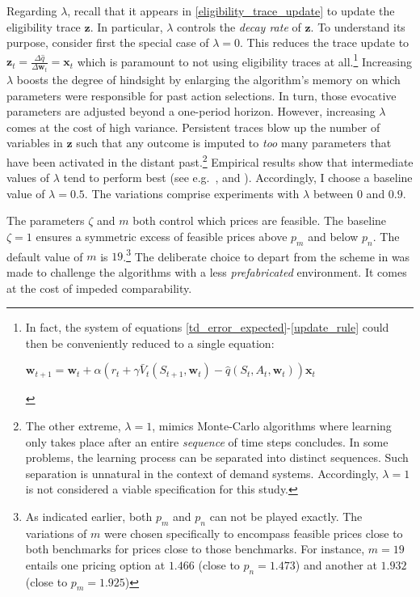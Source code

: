 {Regarding $\lambda$, recall that it appears in \autoref{eligibility_trace_update} to update the eligibility trace $\boldsymbol{z}$. In particular, $\lambda$ controls the \emph{decay rate} of $\boldsymbol{z}$. To understand its purpose, consider first the special case of $\lambda = 0$. This reduces the trace update to $\boldsymbol{z}_t = \frac{\Delta \hat{q}}{\Delta \boldsymbol{w}_t} = \boldsymbol{x}_t$ which is paramount to not using eligibility traces at all.\footnote{In fact, the system of equations \ref{td_error_expected}-\ref{update_rule} could then be conveniently reduced to a single equation:
	\begin{center}
		$\boldsymbol{w}_{t+1} = \boldsymbol{w}_t + \alpha (r_t + \gamma \bar{V}_t(S_{t+1}, \boldsymbol{w}_t) - \hat{q}(S_t, A_t, \boldsymbol{w}_t)) \boldsymbol{x}_t$
	\end{center}
} Increasing $\lambda$ boosts the degree of hindsight by enlarging the algorithm's memory on which parameters were responsible for past action selections. In turn, those evocative parameters are adjusted beyond a one-period horizon. However, increasing $\lambda$ comes at the cost of high variance. Persistent traces blow up the number of variables in $\boldsymbol{z}$ such that any outcome is imputed to \emph{too} many parameters that have been activated in the distant past.\footnote{The other extreme, $\lambda = 1$, mimics Monte-Carlo algorithms where learning only takes place after an entire \emph{sequence} of time steps concludes. In some problems, the learning process can be separated into distinct sequences. Such separation is unnatural in the context of demand systems. Accordingly, $\lambda = 1$ is not considered a viable specification for this study.} Empirical results show that intermediate values of $\lambda$ tend to perform best (see e.g.\ \textcite{sutton_learning_1988}, \textcite{rummery_-line_1994} and \textcite{sutton_reinforcement_2018}). Accordingly, I choose a baseline value of $\lambda = 0.5$. The variations comprise experiments with $\lambda$ between $0$ and $0.9$.

The parameters $\zeta$ and $m$ both control which prices are feasible. The baseline $\zeta = 1$ ensures a symmetric excess of feasible prices above $p_m$ and below $p_n$. The default value of $m$ is $19$.\footnote{As indicated earlier, both $p_m$ and $p_n$ can not be played exactly. The variations of $m$ were chosen specifically to encompass feasible prices close to both benchmarks for prices close to those benchmarks. For instance, $m = 19$ entails one pricing option at $1.466$ (close to $p_n = 1.473$) and another at $1.932$ (close to $p_m = 1.925$)} The deliberate choice to depart from the scheme in \textcite{calvano_artificial_2020} was made to challenge the algorithms with a less \emph{prefabricated} environment. It comes at the cost of impeded comparability.



}
